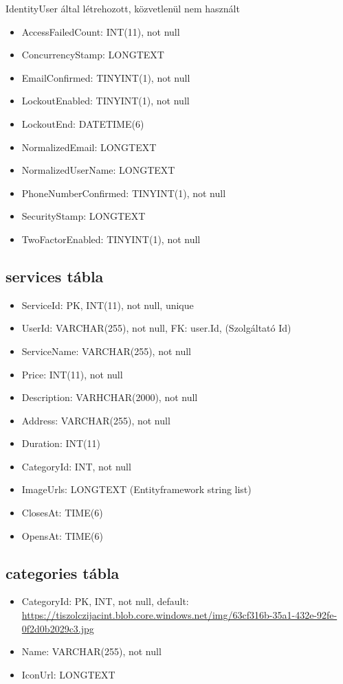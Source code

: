 \documentclass[11pt]{article}
\begin{document}
IdentityUser által létrehozott, közvetlenül nem használt
\begin{itemize}
\item AccessFailedCount: INT(11), not null
\item ConcurrencyStamp: LONGTEXT
\item EmailConfirmed: TINYINT(1), not null
\item LockoutEnabled: TINYINT(1), not null
\item LockoutEnd: DATETIME(6)
\item NormalizedEmail: LONGTEXT
\item NormalizedUserName: LONGTEXT
\item PhoneNumberConfirmed: TINYINT(1), not null
\item SecurityStamp: LONGTEXT
\item TwoFactorEnabled: TINYINT(1), not null
\end{itemize}
\subsection{services tábla}
\label{sec:org67b559f}
\begin{itemize}
\item ServiceId: PK, INT(11), not null, unique
\item UserId: VARCHAR(255), not null, FK: user.Id, (Szolgáltató Id)
\item ServiceName: VARCHAR(255), not null
\item Price: INT(11), not null
\item Description: VARHCHAR(2000), not null
\item Address: VARCHAR(255), not null
\item Duration: INT(11)
\item CategoryId: INT, not null
\item ImageUrls: LONGTEXT (Entityframework string list)
\item ClosesAt: TIME(6)
\item OpensAt: TIME(6)
\end{itemize}
\subsection{categories tábla}
\label{sec:org92d46fd}
\begin{itemize}
\item CategoryId: PK, INT, not null, default: \url{https://tiszolczijacint.blob.core.windows.net/img/63cf316b-35a1-432e-92fe-0f2d0b2029c3.jpg}
\item Name: VARCHAR(255), not null
\item IconUrl: LONGTEXT
\end{itemize}
\end{document}
